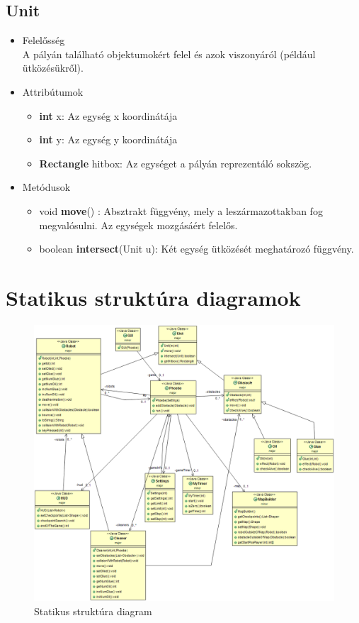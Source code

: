 \subsection{Unit}
\begin{itemize}
\item Felelősség\\
A pályán található objektumokért felel és azok viszonyáról (például ütközésükről).
\item Attribútumok
	\begin{itemize}
		\item \textbf{int} x: Az egység x koordinátája
		\item \textbf{int} y: Az egység y koordinátája
		\item \textbf{Rectangle} hitbox: Az egységet a pályán reprezentáló sokszög.
	\end{itemize}
\item Metódusok
	\begin{itemize}
		\item void \textbf{move}() : Absztrakt függvény, mely a leszármazottakban fog megvalósulni. Az egységek mozgásáért felelős.
		\item boolean \textbf{intersect}(Unit u): Két egység ütközését meghatározó függvény.
	\end{itemize}
\end{itemize}
\pagebreak
\section{Statikus struktúra diagramok}

\begin{figure}[h]
\begin{center}
\includegraphics[width=17cm]{images/struktdiagram.PNG}
\caption{Statikus struktúra diagram}
\label{fig:example3}
\end{center}
\end{figure}
\pagebreak
\pagebreak


